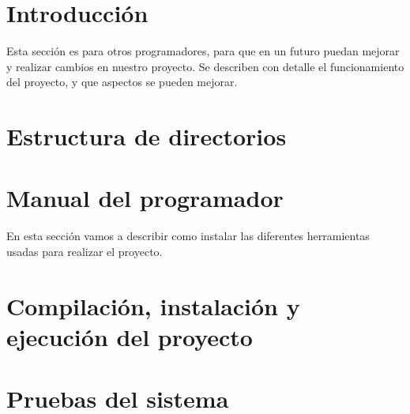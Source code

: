
\section{Introducción}
Esta sección es para otros programadores, para que en un futuro puedan mejorar y realizar cambios en nuestro proyecto. Se describen con detalle el funcionamiento del proyecto, y que aspectos se pueden mejorar.

\section{Estructura de directorios}

\section{Manual del programador}
En esta sección vamos a describir como instalar las diferentes herramientas usadas para realizar el proyecto.


\section{Compilación, instalación y ejecución del proyecto}

\section{Pruebas del sistema}
